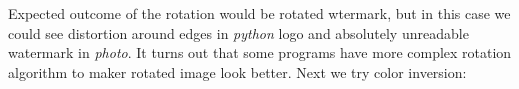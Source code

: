 \documentclass[a4paper, 12pt]{article}
\begin{document}
        \begin{figure}[h]%
			\centering
			\qquad
			\label{fig:45}%
		\end{figure}

		\begin{figure}[h]%
			\centering
			\qquad
			\label{}%
		\end{figure}
	
	\newpage

    	Expected outcome of the rotation would be rotated wtermark, but in this case we could see distortion around edges in \textit{python} logo and absolutely unreadable watermark in \textit{photo}. It turns out that some programs have more complex rotation algorithm to maker rotated image look better. Next we try color inversion:
    	
\end{document}
